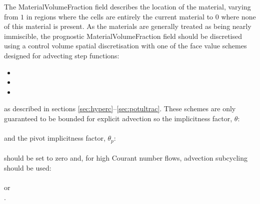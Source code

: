 The MaterialVolumeFraction field describes the location of the material, varying from $1$ in regions where the cells are entirely the current material to $0$ where none of this material is present.  As the materials are generally treated as being nearly immiscible, the prognostic MaterialVolumeFraction field should be discretised using a control volume spatial discretisation with one of the face value schemes designed for advecting step functions:
\begin{itemize}
\item {}
\item {}
\item {}
\end{itemize}
as described in sections \ref{sec:hyperc}--\ref{sec:potultrac}.  These schemes are only guaranteed to be bounded for explicit advection so the implicitness factor, $\theta$:\\
\\
and the pivot implicitness factor, $\theta_p$:\\
\\
should be set to zero and, for high Courant number flows, advection subcycling should be used:\\
\\
or\\
.

